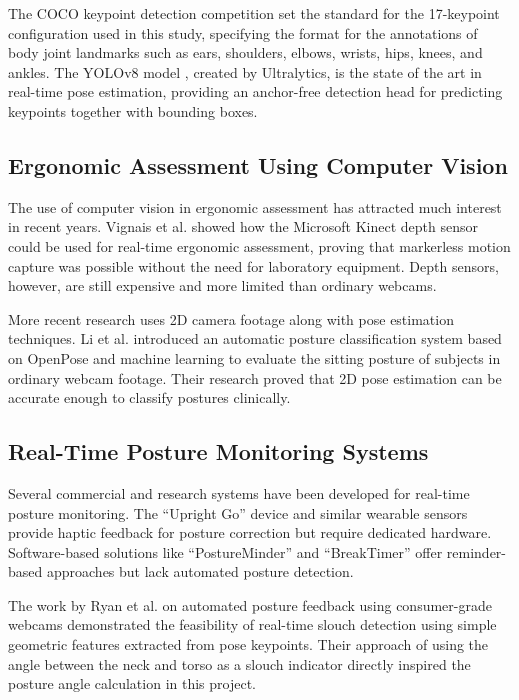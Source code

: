 \documentclass{llncs}
\begin{document}
The COCO keypoint detection competition \cite{cocodataset} set the standard for the 17-keypoint configuration used in this study, specifying the format for the annotations of body joint landmarks such as ears, shoulders, elbows, wrists, hips, knees, and ankles. The YOLOv8 model \cite{ultralytics}, created by Ultralytics, is the state of the art in real-time pose estimation, providing an anchor-free detection head for predicting keypoints together with bounding boxes.

\subsection{Ergonomic Assessment Using Computer Vision}
The use of computer vision in ergonomic assessment has attracted much interest in recent years. Vignais et al. \cite{vignais2013innovative} showed how the Microsoft Kinect depth sensor could be used for real-time ergonomic assessment, proving that markerless motion capture was possible without the need for laboratory equipment. Depth sensors, however, are still expensive and more limited than ordinary webcams.

More recent research uses 2D camera footage along with pose estimation techniques. Li et al. \cite{li2020automated} introduced an automatic posture classification system based on OpenPose and machine learning to evaluate the sitting posture of subjects in ordinary webcam footage. Their research proved that 2D pose estimation can be accurate enough to classify postures clinically.

\subsection{Real-Time Posture Monitoring Systems}
Several commercial and research systems have been developed for real-time posture monitoring. The ``Upright Go'' device and similar wearable sensors provide haptic feedback for posture correction but require dedicated hardware. Software-based solutions like ``PostureMinder'' and ``BreakTimer'' offer reminder-based approaches but lack automated posture detection.

The work by Ryan et al. \cite{ryan2018automated} on automated posture feedback using consumer-grade webcams demonstrated the feasibility of real-time slouch detection using simple geometric features extracted from pose keypoints. Their approach of using the angle between the neck and torso as a slouch indicator directly inspired the posture angle calculation in this project.
\end{document}
